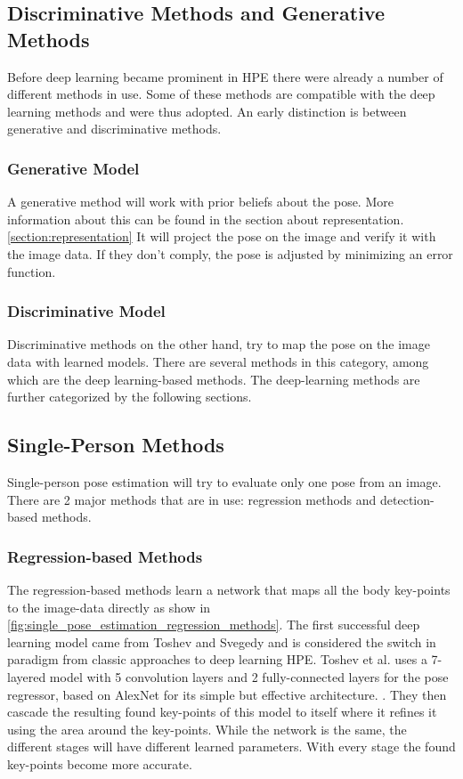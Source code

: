\subsection{Discriminative Methods and Generative Methods}
Before deep learning became prominent in \gls{HPE} there were already a number of different methods in use.
Some of these methods are compatible with the deep learning methods and were thus adopted.
An early distinction is between generative and discriminative methods.

\subsubsection{Generative Model}
A generative method will work with prior beliefs about the pose.
More information about this can be found in the section about representation.\ref{section:representation}
It will project the pose on the image and verify it with the image data.
If they don't comply, the pose is adjusted by minimizing an error function.\cite{Pons-Moll2011}

\subsubsection{Discriminative Model}
Discriminative methods on the other hand, try to map the pose on the image data with learned models.
There are several methods in this category, among which are the deep learning-based methods.
The deep-learning methods are further categorized by the following sections.

\subsection{Single-Person Methods}
Single-person pose estimation will try to evaluate only one pose from an image.
There are 2 major methods that are in use: regression methods and detection-based methods.

\subsubsection{Regression-based Methods}
The regression-based methods learn a network that maps all the body key-points to the image-data directly as show in \ref{fig:single_pose_estimation_regression_methods}.
The first successful deep learning model came from Toshev and Svegedy\cite{Toshev2014} and is considered the switch in paradigm from classic approaches to deep learning \gls{HPE}.
Toshev et al. uses a 7-layered model with 5 convolution layers and 2 fully-connected layers for the pose regressor, based on AlexNet for its simple but effective architecture. \cite{AlexNet}.
They then cascade the resulting found key-points of this model to itself where it refines it using the area around the key-points.
While the network is the same, the different stages will have different learned parameters.
With every stage the found key-points become more accurate.



